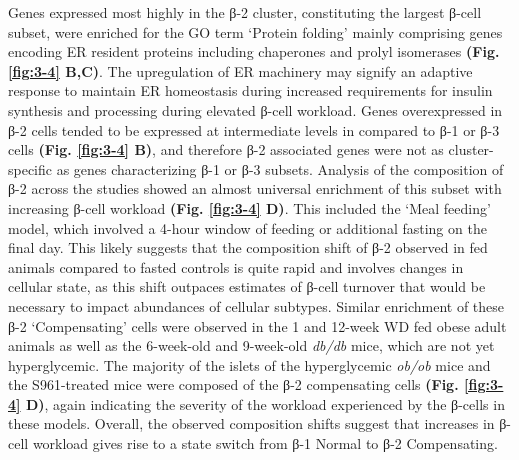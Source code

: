Genes expressed most highly in the β-2 cluster, constituting the largest β-cell subset, were enriched for the GO term `Protein folding' mainly comprising genes encoding ER resident proteins including chaperones and prolyl isomerases \textbf{(Fig. \ref{fig:3-4} B,C)}. The upregulation of ER machinery may signify an adaptive response to maintain ER homeostasis during increased requirements for insulin synthesis and processing during elevated β-cell workload. Genes overexpressed in β-2 cells tended to be expressed at intermediate levels in compared to β-1 or β-3 cells \textbf{(Fig. \ref{fig:3-4} B)}, and therefore β-2 associated genes were not as cluster-specific as genes characterizing β-1 or β-3 subsets. Analysis of the composition of β-2 across the studies showed an almost universal enrichment of this subset with increasing β-cell workload \textbf{(Fig. \ref{fig:3-4} D)}. This included the `Meal feeding’ model, which involved a 4-hour window of feeding or additional fasting on the final day. This likely suggests that the composition shift of β-2 observed in fed animals compared to fasted controls is quite rapid and involves changes in cellular state, as this shift outpaces estimates of β-cell turnover that would be necessary to impact abundances of cellular subtypes. Similar enrichment of these β-2 `Compensating’ cells  were observed in the 1 and 12-week WD fed obese adult animals as well as the 6-week-old and 9-week-old \textit{db/db} mice, which are not yet hyperglycemic. The majority of the islets of the hyperglycemic \textit{ob/ob} mice and the S961-treated mice were composed of the β-2 compensating cells \textbf{(Fig. \ref{fig:3-4} D)}, again indicating the severity of the workload experienced by the β-cells in these models. Overall, the observed composition shifts suggest that increases in β-cell workload gives rise to a state switch from β-1 Normal to β-2 Compensating.\\\\
